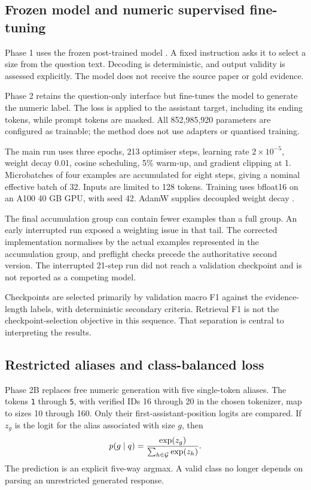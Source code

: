 \subsection{Frozen model and numeric supervised fine-tuning}
Phase 1 uses the frozen post-trained
 model \cite{qwen2026instruct}. A fixed
instruction asks it to select a size from the question text. Decoding
is deterministic, and output validity is assessed explicitly. The
model does not receive the source paper or gold evidence.

Phase 2 retains the question-only interface but fine-tunes the model
to generate the numeric label. The loss is applied to the assistant
target, including its ending tokens, while prompt tokens are masked.
All 852,985,920 parameters are configured as trainable; the method does
not use adapters or quantised training.

The main run uses three epochs, 213 optimiser steps, learning rate
$2\times10^{-5}$, weight decay 0.01, cosine scheduling, 5\% warm-up,
and gradient clipping at 1. Microbatches of four examples are accumulated
for eight steps, giving a nominal effective batch of 32. Inputs are
limited to 128 tokens. Training uses bfloat16 on an A100 40 GB GPU,
with seed 42. AdamW supplies decoupled weight decay
\cite{loshchilov2019adamw}.

The final accumulation group can contain fewer examples than a full
group. An early interrupted run exposed a weighting issue in that
tail. The corrected implementation normalises by the actual examples
represented in the accumulation group, and preflight checks precede
the authoritative second version. The interrupted 21-step run did
not reach a validation checkpoint and is not reported as a competing
model.

Checkpoints are selected primarily by validation macro F1 against the
evidence-length labels, with deterministic secondary criteria.
Retrieval F1 is not the checkpoint-selection objective in this
sequence. That separation is central to interpreting the results.

\subsection{Restricted aliases and class-balanced loss}
Phase 2B replaces free numeric generation with five single-token aliases.
The tokens \texttt{1} through \texttt{5}, with verified IDs 16 through
20 in the chosen tokenizer, map to sizes 10 through 160. Only their
first-assistant-position logits are compared. If $z_g$ is the logit
for the alias associated with size $g$, then
\begin{equation}
p(g\mid q)=\frac{\exp(z_g)}{\sum_{h\in\mathcal{G}}\exp(z_h)}.
\end{equation}
The prediction is an explicit five-way argmax. A valid class no longer
depends on parsing an unrestricted generated response.

